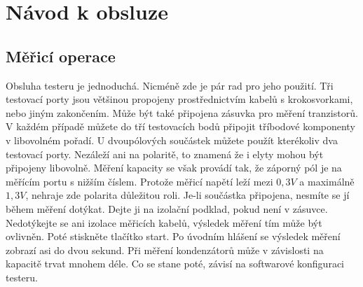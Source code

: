 \chapter{Návod k obsluze}
\label{sec:manual}

\section{Měřicí operace}

Obsluha testeru je jednoduchá. Nicméně zde je pár rad pro jeho použití.
Tři testovací porty jsou většinou propojeny prostřednictvím kabelů s krokosvorkami, nebo jiným zakončením.
Může být také připojena zásuvka pro měření tranzistorů.
V každém případě můžete do tří testovacích bodů připojit tříbodové komponenty v libovolném pořadí.
U dvoupólových součástek můžete použít kterékoliv dva testovací porty.
Nezáleží ani na polaritě, to znamená že i elyty mohou být připojeny libovolně.
Měření kapacity se však provádí tak, že záporný pól je na měřícím portu s nižším číslem.
Protože měřicí napětí leží mezi \(0,3V\) a maximálně \(1,3V\), nehraje zde polarita důležitou roli.
Je-li součástka připojena, nesmíte se jí během měření dotýkat. Dejte ji na izolační podklad,
pokud není v zásuvce. Nedotýkejte se ani izolace měřicích kabelů, výsledek měření tím může být ovlivněn.
Poté stiskněte tlačítko start.
Po úvodním hlášení se výsledek měření zobrazí asi do dvou sekund. Při měření kondenzátorů může
v závislosti na kapacitě trvat mnohem déle.
Co se stane poté, závisí na softwarové konfiguraci testeru.
